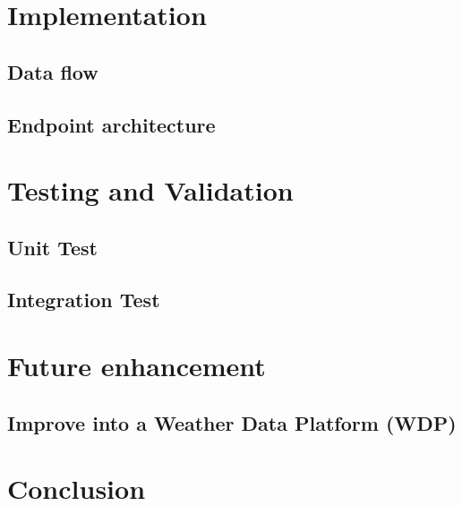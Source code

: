 \documentclass[12pt, a4paper]{report}
\begin{document}
\newpage
\chapter{Implementation}
\section{Data flow}

\section{Endpoint architecture}



\chapter{Testing and Validation}
\section{Unit Test}

\section{Integration Test}


\newpage
\chapter{Future enhancement}
\section*{Improve into a Weather Data Platform (WDP)}


\newpage
\chapter{Conclusion}




\end{document}
